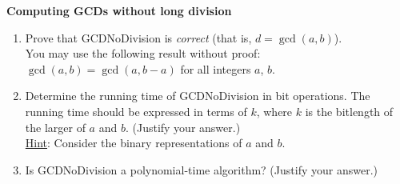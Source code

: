 \begin{problem}{\bf Computing GCDs without long division}
\begin{enumerate}[label=(\alph*)]
\item Prove that GCDNoDivision is \emph{correct} (that is, $d=\gcd(a,b)$).\\
      You may use the following result without proof:
      $\gcd(a,b)=\gcd(a,b-a)$ for all integers $a$, $b$.
\item Determine the running time of GCDNoDivision in bit operations.
      The running time should be expressed in terms of $k$, where $k$
      is the bitlength of the larger of $a$ and $b$. (Justify your answer.)\\
      \underline{Hint}: Consider the binary representations of $a$ and $b$.
\item Is GCDNoDivision a polynomial-time algorithm? (Justify your answer.)
\end{enumerate}
\end{problem}

